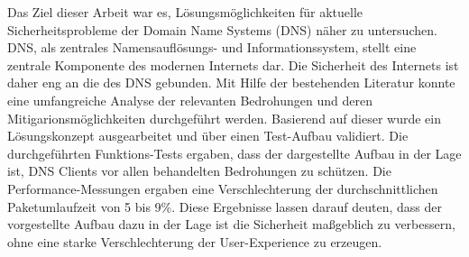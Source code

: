 
Das Ziel dieser Arbeit war es, Lösungsmöglichkeiten für aktuelle Sicherheitsprobleme der Domain Name Systems (DNS) näher zu untersuchen. DNS, als zentrales Namensauflösungs- und Informationssystem, stellt eine zentrale Komponente des modernen Internets dar. Die Sicherheit des Internets ist daher eng an die des DNS gebunden. Mit Hilfe der bestehenden Literatur konnte eine umfangreiche Analyse der relevanten Bedrohungen und deren Mitigarionsmöglichkeiten durchgeführt werden. Basierend auf dieser wurde ein Lösungskonzept ausgearbeitet und über einen Test-Aufbau validiert. Die durchgeführten Funktions-Tests ergaben, dass der dargestellte Aufbau in der Lage ist, DNS Clients vor allen behandelten Bedrohungen zu schützen. Die Performance-Messungen ergaben eine Verschlechterung der durchschnittlichen Paketumlaufzeit von 5 bis 9\%. Diese Ergebnisse lassen darauf deuten, dass der vorgestellte Aufbau dazu in der Lage ist die Sicherheit maßgeblich zu verbessern, ohne eine starke Verschlechterung der User-Experience zu erzeugen.